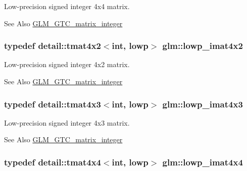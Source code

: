 Low-\/precision signed integer 4x4 matrix. \begin{DoxySeeAlso}{See Also}
\hyperlink{group__gtc__matrix__integer}{G\-L\-M\-\_\-\-G\-T\-C\-\_\-matrix\-\_\-integer} 
\end{DoxySeeAlso}
\hypertarget{group__gtc__matrix__integer_ga0d7055814ab969df3b844ba9c52dbf61}{
\subsubsection[{lowp\-\_\-imat4x2}]{\setlength{\rightskip}{0pt plus 5cm}typedef detail\-::tmat4x2$<$int, lowp$>$ {\bf glm\-::lowp\-\_\-imat4x2}}}\label{group__gtc__matrix__integer_ga0d7055814ab969df3b844ba9c52dbf61}
Low-\/precision signed integer 4x2 matrix. \begin{DoxySeeAlso}{See Also}
\hyperlink{group__gtc__matrix__integer}{G\-L\-M\-\_\-\-G\-T\-C\-\_\-matrix\-\_\-integer} 
\end{DoxySeeAlso}
\hypertarget{group__gtc__matrix__integer_ga73858cf965b0aa7e72908eb817c192d6}{
\subsubsection[{lowp\-\_\-imat4x3}]{\setlength{\rightskip}{0pt plus 5cm}typedef detail\-::tmat4x3$<$int, lowp$>$ {\bf glm\-::lowp\-\_\-imat4x3}}}\label{group__gtc__matrix__integer_ga73858cf965b0aa7e72908eb817c192d6}
Low-\/precision signed integer 4x3 matrix. \begin{DoxySeeAlso}{See Also}
\hyperlink{group__gtc__matrix__integer}{G\-L\-M\-\_\-\-G\-T\-C\-\_\-matrix\-\_\-integer} 
\end{DoxySeeAlso}
\hypertarget{group__gtc__matrix__integer_ga92339a0b053a721e3b88267e6d175014}{
\subsubsection[{lowp\-\_\-imat4x4}]{\setlength{\rightskip}{0pt plus 5cm}typedef detail\-::tmat4x4$<$int, lowp$>$ {\bf glm\-::lowp\-\_\-imat4x4}}}\label{group__gtc__matrix__integer_ga92339a0b053a721e3b88267e6d175014}
